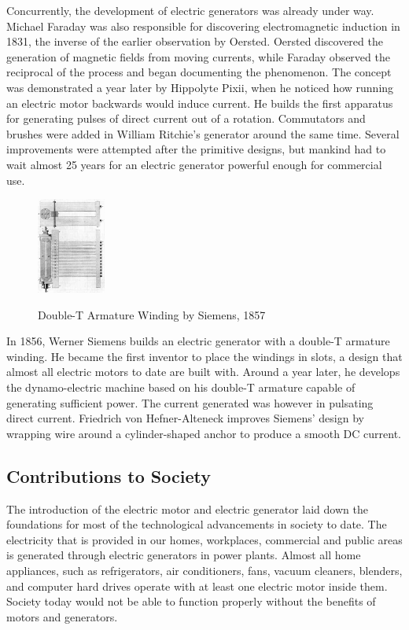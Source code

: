     \noindent
    Concurrently, the development of electric generators was already under way. Michael Faraday was also responsible for discovering electromagnetic induction in 1831, the inverse of the earlier observation by Oersted. Oersted discovered the generation of magnetic fields from moving currents, while Faraday observed the reciprocal of the process and began documenting the phenomenon. The concept was demonstrated a year later by Hippolyte Pixii, when he noticed how running an electric motor backwards would induce current. He builds the first apparatus for generating pulses of direct current out of a rotation. \cite{pixii} Commutators and brushes were added in William Ritchie’s generator around the same time. Several improvements were attempted after the primitive designs, but mankind had to wait almost 25 years for an electric generator powerful enough for commercial use.\\

    \begin{figure}[!ht]
        \begin{center}
            \includegraphics[width=0.2\textwidth]{figures/history/siemens.jpg}
            \label{fig:siemens} \caption{Double-T Armature Winding by Siemens, 1857}
        \end{center}
    \end{figure}

    \noindent
    In 1856, Werner Siemens builds an electric generator with a double-T armature winding. He became the first inventor to place the windings in slots, a design that almost all electric motors to date are built with. \cite{siemens} Around a year later, he develops the dynamo-electric machine based on his double-T armature capable of generating sufficient power. The current generated was however in pulsating direct current. Friedrich von Hefner-Alteneck improves Siemens’ design by wrapping wire around a cylinder-shaped anchor to produce a smooth DC current. \cite{hefner} 

    \subsection{Contributions to Society}
    The introduction of the electric motor and electric generator laid down the foundations for most of the technological advancements in society to date. The electricity that is provided in our homes, workplaces, commercial and public areas is generated through electric generators in power plants. Almost all home appliances, such as refrigerators, air conditioners, fans, vacuum cleaners, blenders, and computer hard drives operate with at least one electric motor inside them. Society today would not be able to function properly without the benefits of motors and generators.

\clearpage
